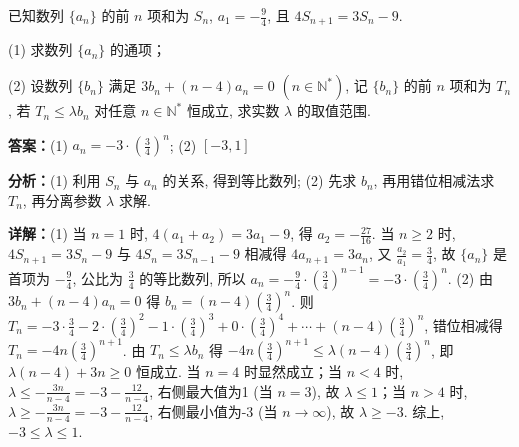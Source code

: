 \begin{question}[points=15]
已知数列 $\{a_n\}$ 的前 $n$ 项和为 $S_n$, $a_1=-\frac94$, 且 $4S_{n+1}=3S_n-9$.

(1) 求数列 $\{a_n\}$ 的通项；

(2) 设数列 $\{b_n\}$ 满足 $3b_n+(n-4)a_n=0$ $(n\in\mathbb{N}^*)$, 记 $\{b_n\}$ 的前 $n$ 项和为 $T_n$, 若 $T_n \leq \lambda b_n$ 对任意 $n\in\mathbb{N}^*$ 恒成立, 求实数 $\lambda$ 的取值范围.
\begin{solution}
\textbf{答案：}(1) $a_n = -3\cdot\left(\frac34\right)^n$; (2) $[-3,1]$

\textbf{分析：}(1) 利用 $S_n$ 与 $a_n$ 的关系, 得到等比数列; (2) 先求 $b_n$, 再用错位相减法求 $T_n$, 再分离参数 $\lambda$ 求解.

\textbf{详解：}(1) 当 $n=1$ 时, $4(a_1+a_2)=3a_1-9$, 得 $a_2=-\frac{27}{16}$. 当 $n\geq2$ 时, $4S_{n+1}=3S_n-9$ 与 $4S_n=3S_{n-1}-9$ 相减得 $4a_{n+1}=3a_n$, 又 $\frac{a_2}{a_1}=\frac34$, 故 $\{a_n\}$ 是首项为 $-\frac94$, 公比为 $\frac34$ 的等比数列, 所以 $a_n = -\frac94\cdot\left(\frac34\right)^{n-1} = -3\cdot\left(\frac34\right)^n$.
(2) 由 $3b_n+(n-4)a_n=0$ 得 $b_n = (n-4)\left(\frac34\right)^n$. 则 $T_n = -3\cdot\frac34 -2\cdot\left(\frac34\right)^2 -1\cdot\left(\frac34\right)^3 +0\cdot\left(\frac34\right)^4 +\cdots+(n-4)\left(\frac34\right)^n$, 错位相减得 $T_n = -4n\left(\frac34\right)^{n+1}$. 由 $T_n\leq\lambda b_n$ 得 $-4n\left(\frac34\right)^{n+1} \leq \lambda (n-4)\left(\frac34\right)^n$, 即 $\lambda(n-4) + 3n \geq 0$ 恒成立. 当 $n=4$ 时显然成立；当 $n<4$ 时, $\lambda \leq -\frac{3n}{n-4} = -3-\frac{12}{n-4}$, 右侧最大值为1 (当 $n=3$), 故 $\lambda\leq1$；当 $n>4$ 时, $\lambda \geq -\frac{3n}{n-4} = -3-\frac{12}{n-4}$, 右侧最小值为-3 (当 $n\to\infty$), 故 $\lambda\geq-3$. 综上, $-3\leq\lambda\leq1$.
\end{solution}
\end{question}

